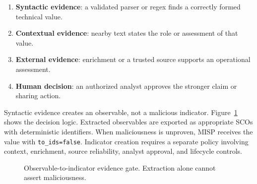 \documentclass[conference]{IEEEtran}
\begin{document}
\begin{enumerate}
  \item \textbf{Syntactic evidence}: a validated parser or regex finds a correctly formed technical value.
  \item \textbf{Contextual evidence}: nearby text states the role or assessment of that value.
  \item \textbf{External evidence}: enrichment or a trusted source supports an operational assessment.
  \item \textbf{Human decision}: an authorized analyst approves the stronger claim or sharing action.
\end{enumerate}

Syntactic evidence creates an observable, not a malicious indicator. Figure~\ref{fig:gate} shows the decision logic. Extracted observables are exported as appropriate SCOs with deterministic identifiers. When maliciousness is unproven, MISP receives the value with \texttt{to\_ids=false}. Indicator creation requires a separate policy involving context, enrichment, source reliability, analyst approval, and lifecycle controls.

\begin{figure}[t]
\centering
{}
\caption{Observable-to-indicator evidence gate. Extraction alone cannot assert maliciousness.}
\label{fig:gate}
\end{figure}
\end{document}
